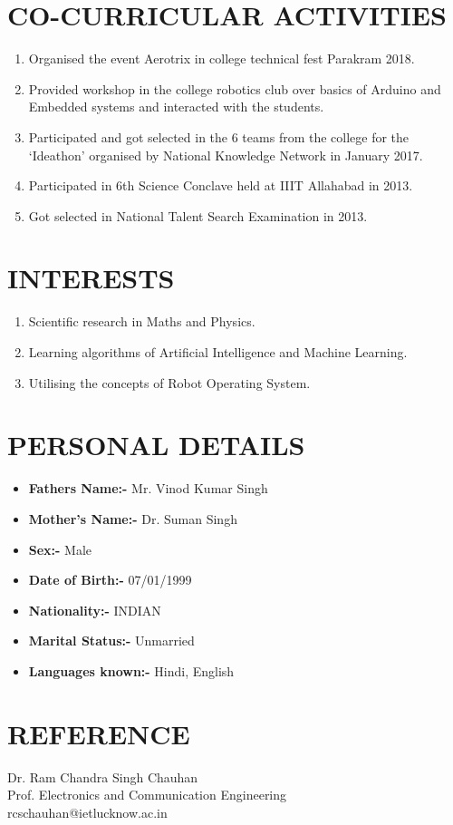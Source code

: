 \documentclass[margin,line]{res}
\begin{document}
\begin{resume}
\section{\sc CO-CURRICULAR ACTIVITIES}
\begin{enumerate}
\item Organised the event Aerotrix in college technical fest Parakram 2018.
\item Provided workshop in the college robotics club over basics of Arduino and Embedded systems and interacted with the students.
\item Participated and got selected in the 6 teams from the college for the ‘Ideathon’ organised by National Knowledge Network in January 2017.
\item Participated in 6th Science Conclave held at IIIT Allahabad in 2013.
\item Got selected in National Talent Search Examination in 2013.
\end{enumerate}\hfill

\section{\sc INTERESTS}
\begin{enumerate}
\item Scientific research in Maths and Physics.
\item Learning algorithms of Artificial Intelligence and Machine Learning.
\item Utilising the concepts of Robot Operating System.
\end{enumerate}

\section{\sc PERSONAL DETAILS}
\begin{itemize}
\item {\bf Fathers Name:-} Mr. Vinod Kumar Singh
\item {\bf Mother’s Name:-} Dr. Suman Singh
\item {\bf Sex:-} Male
\item {\bf Date of Birth:-} 07/01/1999
\item {\bf Nationality:-} INDIAN
\item {\bf Marital Status:-} Unmarried
\item {\bf Languages known:-} Hindi, English
\end{itemize}

\section{\sc REFERENCE} Dr. Ram Chandra Singh Chauhan\\
Prof. Electronics and Communication Engineering\\ rcschauhan@ietlucknow.ac.in


\end{resume}
\end{document}
